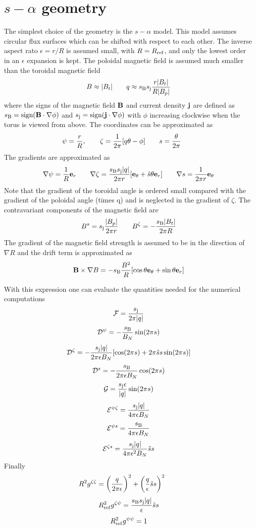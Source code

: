 \documentclass{report}
\def\be{\begin{equation}}
\def\ee{\end{equation}}
\begin{document}
\section{$s-\alpha$ geometry} 
The simplest choice of the geometry is the $s-\alpha$ model. This model assumes circular 
flux surfaces which can be shifted with respect to each other. The inverse aspect rato $\epsilon = r / R$ 
is assumed small, with $R=R_{\rm ref}$, and only the lowest order in an $\epsilon$ expansion is kept. 
The poloidal magnetic field is assumed much smaller than the toroidal magnetic field
\be 
B \approx |B_t| \qquad 
q \approx s_{\rm B}s_{\rm j} {r |B_t| \over R |B_p|} 
\ee 
where the signs of the magnetic field ${\bf B}$ and current density ${\bf j}$ are defined as $s_{\rm B}=\textrm{sign}(\bf{B}\cdot\nabla\phi)$ and $s_{\rm j}=\textrm{sign}(\bf{j}\cdot\nabla\phi)$
with $\phi$ increasing clockwise when the torus is viewed from above. 
The coordinates can be approximated as 
\be 
\psi = {r \over R}, \qquad 
\zeta =  {1\over 2 \pi} [q \theta - \phi ] \qquad 
s = {\theta \over 2 \pi }  \qquad 
\ee
The gradients are approximated as  
\be 
\nabla \psi = {1\over R} {\bf e}_r \qquad 
\nabla \zeta = {s_{\rm B}s_{\rm j}|q| \over 2 \pi r} [ {\bf e}_\theta + \hat s \theta {\bf e}_r ]  \qquad 
\nabla s = {1 \over 2 \pi r} {\bf e}_\theta
\ee 
Note that the gradient of the toroidal angle is ordered small compared with the gradient of the poloidal
angle (times q) and is neglected in the gradient of $\zeta$. The contravariant components of the 
magnetic field are 
\be 
B^s = s_{\rm j}{|B_p| \over 2 \pi r} \qquad 
B^\zeta = -{s_{\rm B}|B_t| \over 2 \pi R}  
\ee 
The gradient of the magnetic field strength is assumed to be in the direction of $\nabla R$ and the 
drift term is approximated as 
\be 
{\bf B} \times \nabla B = -s_{\rm B}{B^2 \over R} [ \cos \theta {\bf e}_\theta + \sin \theta {\bf e}_r ] 
\ee 


With this expression one can evaluate the quantities needed for the numerical computations 
\be 
{\cal F} = {s_{\rm j}\over 2 \pi |q|} 
\ee
\be 
{\cal D^\psi} = - {s_{\rm B}\over B_N} \sin (2 \pi s)
\ee 
\be 
{\cal D}^\zeta = - {s_{\rm j}|q| \over 2 \pi \epsilon B_N} [ \cos (2 \pi s) + 2 \pi \hat s s \sin (2 \pi s) ] 
\ee
\be 
{\cal D}^s = -{s_{\rm B}\over 2 \pi \epsilon B_N} \cos ( 2 \pi s) 
\ee
\be 
{\cal G} =  {s_{\rm j}\epsilon \over |q|} \sin ( 2 \pi s) 
\ee
\be 
{\cal E}^{\psi \zeta} = {s_{\rm j}|q| \over 4 \pi \epsilon B_N}
\ee
\be 
{\cal E}^{\psi s} =  {s_{\rm B} \over 4 \pi \epsilon B_N}
\ee
\be 
{\cal E}^{\zeta s} =  { s_{\rm j}|q| \over 4 \pi \epsilon^2 B_N } \hat s s 
\ee
Finally 
\be 
R^2g^{\zeta \zeta} = \biggl ( {q \over 2 \pi \epsilon} \biggr )^2 + \biggl ( {q \over\epsilon} \hat{s} s \biggr )^2 \qquad 
\ee
\be 
R_{\rm ref}^2 g^{\zeta \psi} = {s_{\rm B}s_{\rm j}|q| \over \epsilon} \hat s s 
\ee 
\be  
R_{\rm ref}^2 g^{\psi \psi} = 1 
\ee 
\end{document}
